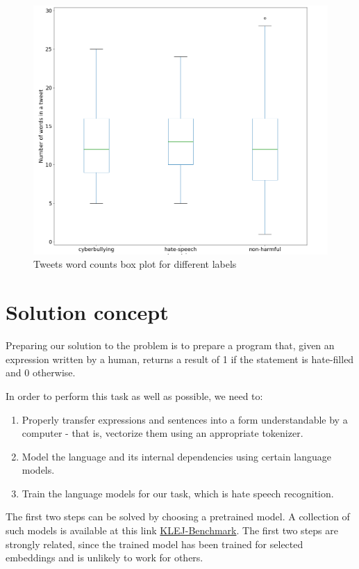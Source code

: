\documentclass[a4paper]{article}
\begin{document}
\begin{figure}[H]
\centering
\includegraphics[width=\textwidth]{plots/tweet_word_counts_box_plot.png}
\caption{Tweets word counts box plot for different labels}
\end{figure}

\newpage
\section{Solution concept}

Preparing our solution to the problem is to prepare a program that, given an expression written by a human, returns a result of 1 if the statement is hate-filled and 0 otherwise. 

In order to perform this task as well as possible, we need to:
\begin{enumerate}
    \item Properly transfer expressions and sentences into a form understandable by a computer - that is, vectorize them using an appropriate tokenizer. 
    \item Model the language and its internal dependencies using certain language models.
    \item Train the language models for our task, which is hate speech recognition.
\end{enumerate}

The first two steps can be solved by choosing a pretrained model. A collection of such models is available at this link \href{https://klejbenchmark.com/leaderboard/}{KLEJ-Benchmark}.
The first two steps are strongly related, since the trained model has been trained for selected embeddings and is unlikely to work for others.
\end{document}

